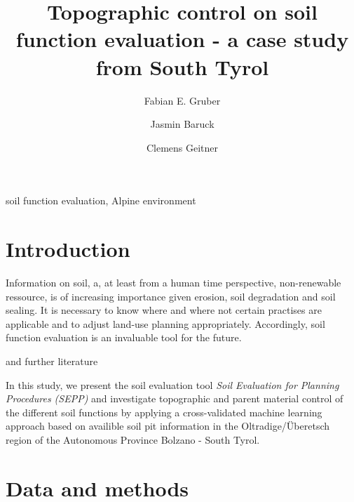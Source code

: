 \documentclass[preprint,12pt,authoryear]{elsarticle}
\begin{document}
\begin{frontmatter}

\title{Topographic control on soil function evaluation -  a case study from South Tyrol}



\author[mymainadress]{Fabian E. Gruber}
\author[mymainadress]{Jasmin Baruck}
\author[mymainadress]{Clemens Geitner}



\address[mymainadress]{Institute of Geography, University of Innsbruck, Innrain 52f, 6020 Innsbruck, Austria}

\begin{abstract}

\end{abstract}

\begin{keyword}
soil function evaluation, Alpine environment
\end{keyword}

\end{frontmatter}

\linenumbers

\section{Introduction}
Information on soil, a, at least from a human time perspective, non-renewable ressource, is of increasing importance given erosion, soil degradation and soil sealing. It is necessary to know where and where not certain practises are applicable and to adjust land-use planning appropriately. Accordingly, soil function evaluation is an invaluable tool for the future.\newline

\cite{Haslmayr2016} and further literature
\newline

In this study, we present the soil evaluation tool \emph{Soil Evaluation for Planning Procedures (SEPP)} and investigate topographic and parent material control of the different soil functions by applying a cross-validated machine learning approach based on availible soil pit information in the Oltradige/\"{U}beretsch region of the Autonomous Province Bolzano - South Tyrol.
\section{Data and methods}
\end{document}
